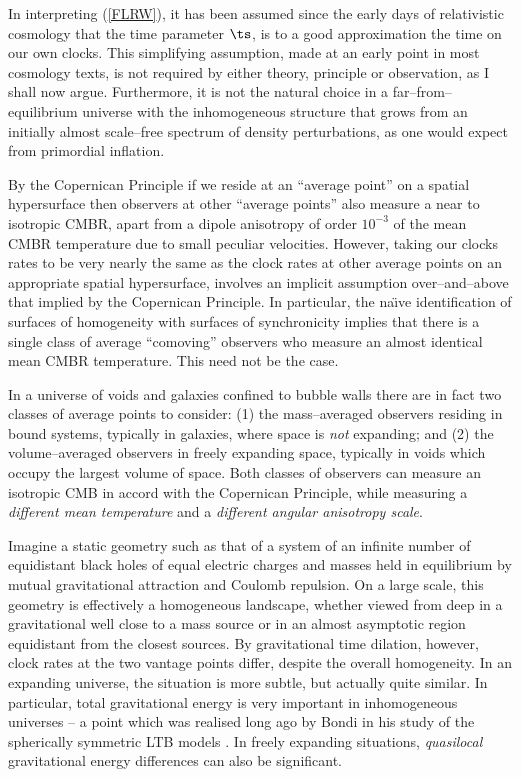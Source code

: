 \documentclass[12pt]{iopart}
\begin{document}
In interpreting (\ref{FLRW}), it has been assumed since the early days of
relativistic cosmology that the time parameter $\ts$, is to a good
approximation the time on our own clocks. This simplifying assumption, made
at an early point in most cosmology texts, is not required by either theory,
principle or observation, as I shall now argue. Furthermore, it is not the
natural choice in a far--from--equilibrium universe with the inhomogeneous
structure that grows from an initially almost scale--free spectrum of
density perturbations, as one would expect from primordial inflation.

By the Copernican Principle if we reside at an ``average point'' on
a spatial hypersurface then observers at other ``average points''
also measure a near to isotropic CMBR, apart from a dipole anisotropy
of order $10^{-3}$ of the mean CMBR temperature due to small peculiar
velocities. However, taking our
clocks rates to be very nearly the same as the clock rates at other
average points on an appropriate spatial hypersurface,
involves an implicit assumption over--and--above that implied by
the Copernican Principle. In particular, the na\"{\i}ve identification
of surfaces of homogeneity with surfaces of synchronicity implies that there
is a single class of average ``comoving'' observers who measure an almost
identical mean CMBR temperature. This need not be the case.

In a universe of voids and galaxies confined to bubble walls there are in
fact two classes of average points to consider: (1) the mass--averaged
observers residing in bound systems, typically in galaxies, where space is
{\em not} expanding; and (2) the volume--averaged observers in freely
expanding space, typically in voids which occupy the largest volume of space.
Both classes of observers can measure an isotropic CMB in accord with the
Copernican Principle, while measuring a {\em different mean temperature}
and a {\em different angular anisotropy scale}.

Imagine a static geometry such as that of a system of an infinite number of
equidistant black holes of equal electric charges and masses held in
equilibrium by mutual gravitational attraction and Coulomb repulsion. On a
large scale, this geometry is effectively a homogeneous landscape, whether
viewed from deep in a gravitational well close to a mass source or in an
almost asymptotic region equidistant from the closest sources. By
gravitational time dilation, however, clock rates at the two vantage points
differ, despite the overall homogeneity. In an expanding universe, the
situation is more subtle, but actually quite similar. In particular, total
gravitational energy is very important in inhomogeneous universes -- a point
which was realised long ago by Bondi \cite{Bondi} in his study of the
spherically symmetric LTB models \cite{LT}.
In freely expanding situations, {\em quasilocal}
gravitational energy differences can also be significant.
\end{document}
